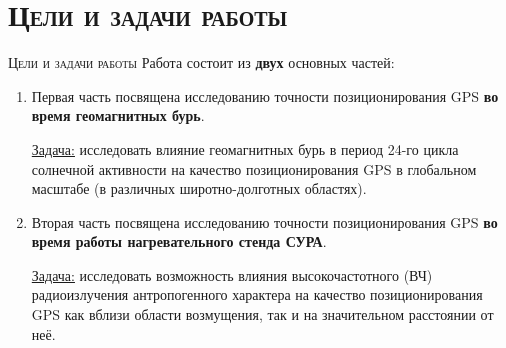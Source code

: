 \section{\textsc{Цели и задачи работы}}
\begin{frame}{\textsc{Цели и задачи работы}}
Работа состоит из \textbf{двух} основных частей:
\begin{enumerate}
\justifying
\item Первая часть посвящена исследованию точности позиционирования GPS \textbf{во время геомагнитных бурь}.  

\underline{Задача:} исследовать влияние геомагнитных бурь в период 24-го цикла солнечной активности на качество позиционирования GPS в глобальном масштабе (в различных широтно-долготных областях).
\item Вторая часть посвящена исследованию точности позиционирования GPS \textbf{во время работы нагревательного стенда СУРА}.

\underline{Задача:} исследовать возможность влияния высокочастотного (ВЧ) радиоизлучения антропогенного характера на качество позиционирования GPS как вблизи области возмущения, так и на значительном расстоянии от неё.
\end{enumerate}
\end{frame}